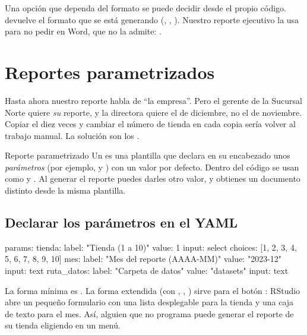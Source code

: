 \begin{consejo}
Una opción que dependa del formato se puede decidir desde el propio código.
 devuelve el formato que se está generando
(, , ). Nuestro reporte
ejecutivo la usa para no pedir  en Word, que no la admite:
.
\end{consejo}

\section{Reportes parametrizados}
\label{sec:m8-parametros}

Hasta ahora nuestro reporte habla de ``la empresa''. Pero el gerente de la
Sucursal Norte quiere \emph{su} reporte, y la directora quiere el de
diciembre, no el de noviembre. Copiar el  diez veces y cambiar
el número de tienda en cada copia sería volver al trabajo manual. La
solución son los .

\begin{concepto}{Reporte parametrizado}
Un  es una plantilla  que
declara en su encabezado unos \emph{parámetros} (por ejemplo,
 y ) con un valor por defecto. Dentro del código
se usan como  y . Al generar el
reporte puedes darles otro valor, y obtienes un documento distinto desde la
misma plantilla.
\end{concepto}

\subsection{Declarar los parámetros en el YAML}

\begin{textocodigo}
params:
  tienda:
    label: "Tienda (1 a 10)"
    value: 1
    input: select
    choices: [1, 2, 3, 4, 5, 6, 7, 8, 9, 10]
  mes:
    label: "Mes del reporte (AAAA-MM)"
    value: "2023-12"
    input: text
  ruta_datos:
    label: "Carpeta de datos"
    value: "datasets"
    input: text
\end{textocodigo}

La forma mínima es . La forma extendida (con
, , ) sirve para el botón
: RStudio abre un pequeño formulario
con una lista desplegable para la tienda y una caja de texto para el mes.
Así, alguien que no programa puede generar el reporte de su tienda eligiendo
en un menú.


